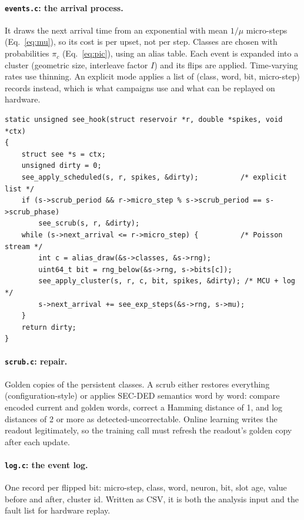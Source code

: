 \documentclass[11pt,a4paper]{article}
\begin{document}
\paragraph{\texttt{events.c}: the arrival process.} It draws the next arrival time from an exponential with mean $1/\mu$ micro-steps (Eq.~\eqref{eq:mu}), so its cost is per upset, not per step. Classes are chosen with probabilities $\pi_c$ (Eq.~\eqref{eq:pic}), using an alias table. Each event is expanded into a cluster (geometric size, interleave factor $I$) and its flips are applied. Time-varying rates use thinning. An explicit mode applies a list of (class, word, bit, micro-step) records instead, which is what campaigns use and what can be replayed on hardware.
\begin{lstlisting}
static unsigned see_hook(struct reservoir *r, double *spikes, void *ctx)
{
    struct see *s = ctx;
    unsigned dirty = 0;
    see_apply_scheduled(s, r, spikes, &dirty);          /* explicit list */
    if (s->scrub_period && r->micro_step % s->scrub_period == s->scrub_phase)
        see_scrub(s, r, &dirty);
    while (s->next_arrival <= r->micro_step) {          /* Poisson stream */
        int c = alias_draw(&s->classes, &s->rng);
        uint64_t bit = rng_below(&s->rng, s->bits[c]);
        see_apply_cluster(s, r, c, bit, spikes, &dirty); /* MCU + log */
        s->next_arrival += see_exp_steps(&s->rng, s->mu);
    }
    return dirty;
}
\end{lstlisting}

\paragraph{\texttt{scrub.c}: repair.} Golden copies of the persistent classes. A scrub either restores everything (configuration-style) or applies SEC-DED semantics word by word: compare encoded current and golden words, correct a Hamming distance of 1, and log distances of 2 or more as detected-uncorrectable. Online learning writes the readout legitimately, so the training call must refresh the readout's golden copy after each update.

\paragraph{\texttt{log.c}: the event log.} One record per flipped bit: micro-step, class, word, neuron, bit, slot age, value before and after, cluster id. Written as CSV, it is both the analysis input and the fault list for hardware replay.
\end{document}

